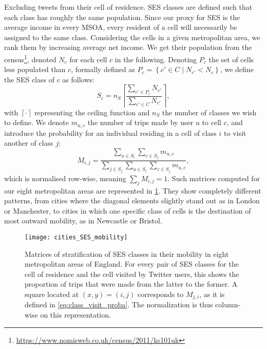 \documentclass[../thesis.tex]{subfiles}
\begin{document}
Excluding tweets from their cell of residence. \ac{SES} classes are defined such that
each class has roughly the same population. Since our proxy for \ac{SES} is the average
income in every \ac{MSOA}, every resident of a cell will necessarily be assigned to the
same class. Considering the cells in a given metropolitan area, we rank them by
increasing average net income. We get their population from the
census\footnote{\url{https://www.nomisweb.co.uk/census/2011/ks101uk}}, denoted $N_c$ for
each cell $c$ in the following. Denoting $P_c$ the set of cells less populated than $c$,
formally defined as $P_c = \left\{ c' \in C \mid N_{c'} < N_c \right\}$, we define the
\ac{SES} class of $c$ as follows:
\begin{equation}
  S_c = n_S \left\lceil \frac{\sum_{c' \in P_c} N_{c'}}{\sum_{c' \in C} N_{c'}} \right\rceil,
\end{equation}
with $\left\lceil \cdot \right\rceil$ representing the ceiling function and $n_S$ the
number of classes we wish to define. We denote $m_{u, c}$ the number of trips made by
user $u$ to cell $c$, and introduce the probability for an individual residing in a cell
of class $i$ to visit another of class $j$:
\begin{equation}
  \label{eq:class_visit_proba}
  M_{i, j} = \frac{
      \sum_{u \in S_i} \sum_{c \in S_j} m_{u, c}
    }{
      \sum_{j \in S_j} \sum_{u \in S_i} \sum_{c \in S_j} m_{u, c}
    },
\end{equation}
which is normalised row-wise, meaning $\sum_j M_{i, j} = 1$. Such matrices computed for
our eight metropolitan areas are represented in \cref{fig:cities_SES_mobility}. They
show completely different patterns, from cities where the diagonal elements slightly
stand out as in London or Manchester, to cities in which one specific class of cells is
the destination of most outward mobility, as in Newcastle or Bristol.
\begin{figure}
\centering
  \texttt{[image: cities\_SES\_mobility]}
  \caption{ Matrices of stratification of \ac{SES} classes in their mobility in eight
  metropolitan areas of England. For every pair of \ac{SES} classes for the cell of
  residence and the cell visited by Twitter users, this shows the proportion of trips
  that were made from the latter to the former. A square located at $(x, y) = (i, j)$
  corresponds to $M_{j, i}$, as it is defined in \cref{eq:class_visit_proba}. The
  normalization is thus column-wise on this representation.}
  \label{fig:cities_SES_mobility}
\end{figure}
\end{document}
